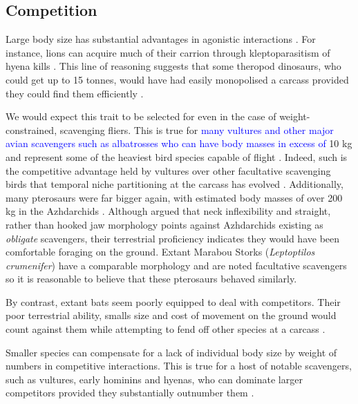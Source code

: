 \documentclass[a4paper,12pt]{article}
\begin{document}
\subsection{Competition}
Large body size has substantial advantages in agonistic interactions \textcolor{blue}{\citep{ruxton2004obligate,moleon2014inter,pereira2014facultative}}. 
For instance, lions can acquire much of their carrion through kleptoparasitism of hyena kills \textcolor{blue}{\citep{trinkel2005competitive,pereira2014facultative,periquet2015lion}}. 
This line of reasoning suggests that some theropod dinosaurs, who could get up to 15 tonnes, would have had easily monopolised a carcass \citep{weishampel2004dinosauria} provided they could find them efficiently \citep{kane2016body}. 

We would expect this trait to be selected for even in the case of weight-constrained, scavenging fliers.
This is true for \textcolor{blue}{many vultures and other major avian scavengers such as albatrosses who can have body masses in excess of} 10 kg and represent some of the heaviest bird species capable of flight \citep{weimerskirch1992reproductive,ferguson2001raptors,donazar2002effects}.
Indeed, such is the competitive advantage held by vultures over other facultative scavenging birds that temporal niche partitioning at the carcass has evolved \textcolor{blue}{\citep{kendall2013alternative,KaneVul,moreno2016behavioral}}. 
Additionally, many pterosaurs were far bigger again, with estimated body masses of over 200 kg in the Azhdarchids \citep{witton2010size}.
Although \cite{witton2008reappraisal} argued that neck inflexibility and straight, rather than hooked jaw morphology points against Azhdarchids existing as \textit{obligate} scavengers, their terrestrial proficiency indicates they would have been comfortable foraging on the ground.
Extant Marabou Storks (\textit{Leptoptilos crumenifer}) have a comparable morphology and are noted facultative scavengers \citep{monadjem2012survival} so it is reasonable to believe that these pterosaurs behaved similarly.

By contrast, extant bats seem poorly equipped to deal with competitors. 
Their poor terrestrial ability, smalls size and cost of movement on the ground would count against them while attempting to fend off other species at a carcass \citep{riskin2006terrestrial,voigt2012terrestrial}.

Smaller species can compensate for a lack of individual body size by weight of numbers in competitive interactions. 
This is true for a host of notable scavengers, such as vultures, early hominins and hyenas, who can dominate larger competitors provided they substantially outnumber them \citep{KaneVul,trinkel2005competitive,ruxton2013endurance}. 
\end{document}
